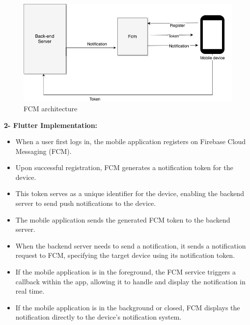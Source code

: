 \documentclass[
12pt,
oneside, 
onehalfspacing, 
nolistspacing, 
parskip, 
chapterinoneline, 
]{AASTCOMPUTER}
\begin{document}
\begin{figure}[!ht]
	\centering
	\includegraphics[scale=0.4]{Figures/Architicture/fcm.jpeg}
  	\caption{FCM architecture}
  	\label{fig:FCM architecture}
\end{figure}

\textbf{2- Flutter Implementation:}

\begin{itemize}
\item When a user first logs in, the mobile application registers on Firebase Cloud Messaging (FCM).
\item Upon successful registration, FCM generates a notification token for the device.
\item This token serves as a unique identifier for the device, enabling the backend server to send push notifications to the device.
\item The mobile application sends the generated FCM token to the backend server.
\item When the backend server needs to send a notification, it sends a notification request to FCM, specifying the target device using its notification token.
\item If the mobile application is in the foreground, the FCM service triggers a callback within the app, allowing it to handle and display the notification in real time.
\item If the mobile application is in the background or closed, FCM displays the notification directly to the device's notification system.
\end{itemize}
\end{document}
